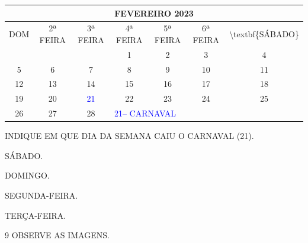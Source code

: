 \begin{table}[]
\begin{tabular}{|ccccccc|}
\hline
\multicolumn{7}{|c|}{FEVEREIRO 2023} \\ \hline
\multicolumn{1}{|c|}{DOM} & \multicolumn{1}{c|}{2ª FEIRA} & \multicolumn{1}{c|}{3ª FEIRA} & \multicolumn{1}{c|}{4ª FEIRA} & \multicolumn{1}{c|}{5ª FEIRA} & \multicolumn{1}{c|}{6ª FEIRA} & \textbackslash{}textbf\{SÁBADO\} \\ \hline
\multicolumn{1}{|c|}{} & \multicolumn{1}{c|}{} & \multicolumn{1}{c|}{} & \multicolumn{1}{c|}{1} & \multicolumn{1}{c|}{2} & \multicolumn{1}{c|}{3} & 4 \\ \hline
\multicolumn{1}{|c|}{5} & \multicolumn{1}{c|}{6} & \multicolumn{1}{c|}{7} & \multicolumn{1}{c|}{8} & \multicolumn{1}{c|}{9} & \multicolumn{1}{c|}{10} & 11 \\ \hline
\multicolumn{1}{|c|}{12} & \multicolumn{1}{c|}{13} & \multicolumn{1}{c|}{14} & \multicolumn{1}{c|}{15} & \multicolumn{1}{c|}{16} & \multicolumn{1}{c|}{17} & 18 \\ \hline
\multicolumn{1}{|c|}{19} & \multicolumn{1}{c|}{20} & \multicolumn{1}{c|}{\textcolor{blue}{21}} & \multicolumn{1}{c|}{22} & \multicolumn{1}{c|}{23} & \multicolumn{1}{c|}{24} & 25 \\ \hline
\multicolumn{1}{|c|}{26} & \multicolumn{1}{c|}{27} & \multicolumn{1}{c|}{28} & \multicolumn{4}{l|}{\textcolor{blue}{21-- CARNAVAL}} \\ \hline
\end{tabular}
\end{table}

INDIQUE EM QUE DIA DA SEMANA CAIU O CARNAVAL (21).

\begin{escolha}
\item SÁBADO.

\item DOMINGO.

\item SEGUNDA-FEIRA.

\item TERÇA-FEIRA.
\end{escolha}


\num{9} OBSERVE AS IMAGENS.

